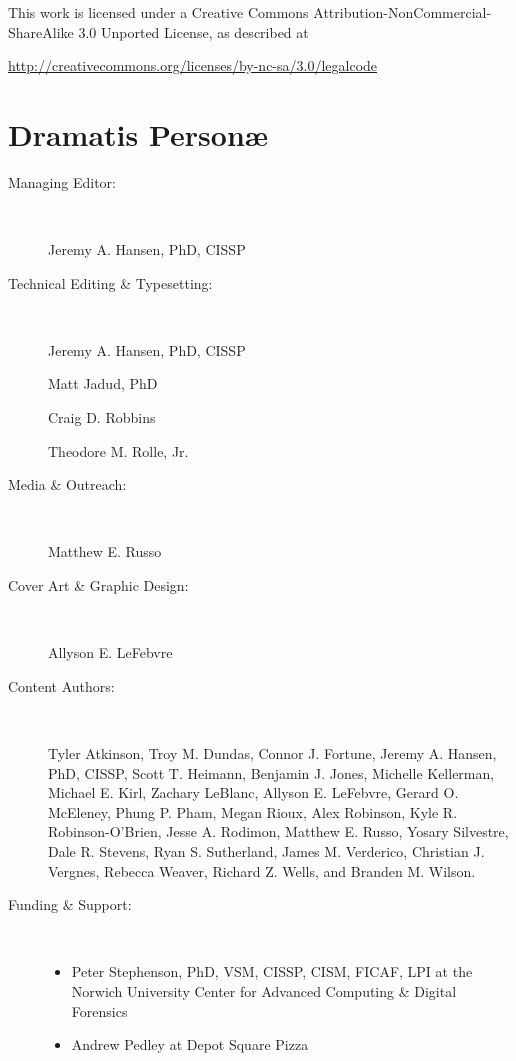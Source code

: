 \documentclass[11pt,final]{book}
\begin{document}
\noindent This work is licensed under a Creative Commons Attribution-NonCommercial-ShareAlike 3.0 Unported License, as described at \newline

\noindent \footnotesize \url{http://creativecommons.org/licenses/by-nc-sa/3.0/legalcode}







   \chapter*{Dramatis Person\ae}

 \begin{description}

 \item[Managing Editor:] ~
 
 Jeremy A. Hansen, PhD, CISSP

 \item[Technical Editing \& Typesetting:] ~
 
 Jeremy A. Hansen, PhD, CISSP
 
 Matt Jadud, PhD
 
 Craig D. Robbins
 
 Theodore M. Rolle, Jr.
 

 \item[Media \& Outreach:] ~
 
 Matthew E. Russo

 \item[Cover Art \& Graphic Design:] ~
 
 Allyson E. LeFebvre

 \item[Content Authors:]\label{ContentAuthors} ~
 
Tyler Atkinson,
Troy M. Dundas,
Connor J. Fortune,
Jeremy A. Hansen, PhD, CISSP,
Scott T. Heimann,
Benjamin J. Jones,
Michelle Kellerman,
Michael E. Kirl,
Zachary LeBlanc,
Allyson E. LeFebvre,
Gerard O. McEleney,
Phung P. Pham,
Megan Rioux,
Alex Robinson,
Kyle R. Robinson-O'Brien,
Jesse A. Rodimon,
Matthew E. Russo,
Yosary Silvestre,
Dale R. Stevens,
Ryan S. Sutherland,
James M. Verderico,
Christian J. Vergnes,
Rebecca Weaver,
Richard Z. Wells, and
Branden M. Wilson.

 \item[Funding \& Support:] ~
 
\begin{itemize}
	\item Peter Stephenson, PhD, VSM, CISSP, CISM, FICAF, LPI at the Norwich University Center for Advanced Computing \& Digital Forensics
  \item Andrew Pedley at Depot Square Pizza


\end{itemize}
\end{description}
\end{document}
